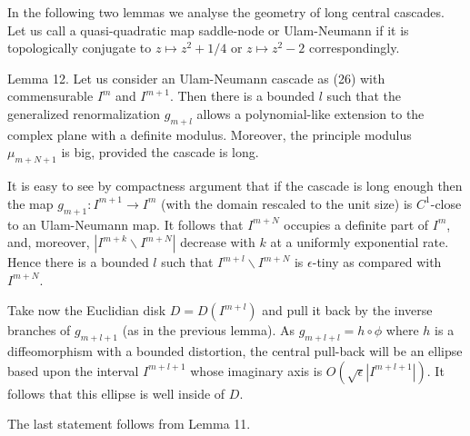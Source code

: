



In the following two lemmas we analyse the geometry of long central cascades.
Let us call a quasi-quadratic map 
saddle-node or Ulam-Neumann if it is topologically
conjugate to $z\mapsto z^2+1/4$ or $z\mapsto z^2-2$ correspondingly. 

 \proclaim Lemma 12. Let us consider an Ulam-Neumann cascade as (26)
 with commensurable $I^m$ and $I^{m+1}$. Then there is a bounded 
  $l$ such that the generalized  renormalization $g_{m+l}$ allows
  a polynomial-like extension to the complex plane with a definite 
  modulus. Moreover, the principle modulus $\mu_{m+N+1}$
  is big, provided the cascade is long.

  It is easy to see by compactness argument
that if the cascade is long
enough then  the map 
$g_{m+1}: I^{m+1}\rightarrow I^m$ (with the domain rescaled to the
unit size) is $C^1$-close to an Ulam-Neumann map. It follows that
$I^{m+N}$ occupies a definite part of $I^m$, and, moreover,
$|I^{m+k}\backslash I^{m+N}|$  decrease with $k$
at a uniformly exponential rate. 
Hence there is a bounded $l$ such that $I^{m+l}\backslash I^{m+N}$
is $\epsilon$-tiny as compared with $I^{m+N}$. 

Take now the Euclidian disk $D=D(I^{m+l})$ and pull it back by the
inverse branches of $g_{m+l+1}$ (as in the previous lemma). 
As $g_{m+l+l}=h\circ \phi$ where $h$ is a diffeomorphism with a
bounded distortion, the central pull-back will be an ellipse based
upon the interval $I^{m+l+1}$
whose imaginary axis is $O(\sqrt{\epsilon}|I^{m+l+1}|)$. It follows that
this ellipse is well inside of $D$.  

 
The last statement follows from Lemma 11.
\QED




